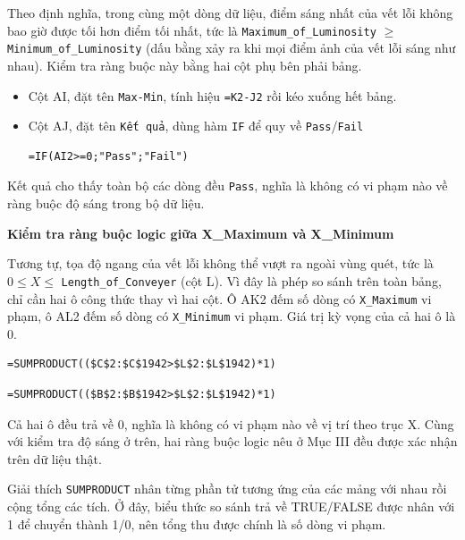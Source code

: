 \documentclass[12pt]{article}
\begin{document}
\noindent
Theo định nghĩa, trong cùng một dòng dữ liệu, điểm sáng nhất của vết lỗi không bao giờ được tối hơn điểm tối nhất, tức là \texttt{Maximum\_of\_Luminosity} $\ge$ \texttt{Minimum\_of\_Luminosity} (dấu bằng xảy ra khi mọi điểm ảnh của vết lỗi sáng như nhau). Kiểm tra ràng buộc này bằng hai cột phụ bên phải bảng.
\begin{itemize}
    \item Cột AI, đặt tên \texttt{Max-Min}, tính hiệu \texttt{=K2-J2} rồi kéo xuống hết bảng.
    \item Cột AJ, đặt tên \texttt{Kết quả}, dùng hàm \texttt{IF} để quy về \texttt{Pass}/\texttt{Fail}
    \begin{aivncodebox}
    \begin{lstlisting}[language=Excel]
=IF(AI2>=0;"Pass";"Fail")\end{lstlisting}
    \end{aivncodebox}
\end{itemize}
Kết quả cho thấy toàn bộ các dòng đều \texttt{Pass}, nghĩa là không có vi phạm nào về ràng buộc độ sáng trong bộ dữ liệu.

\noindent
\textbf{Kiểm tra ràng buộc logic giữa X\_Maximum và X\_Minimum}

\noindent
Tương tự, tọa độ ngang của vết lỗi không thể vượt ra ngoài vùng quét, tức là $0 \le X \le$ \texttt{Length\_of\_Conveyer} (cột L). Vì đây là phép so sánh trên toàn bảng, chỉ cần hai ô công thức thay vì hai cột. Ô AK2 đếm số dòng có \texttt{X\_Maximum} vi phạm, ô AL2 đếm số dòng có \texttt{X\_Minimum} vi phạm. Giá trị kỳ vọng của cả hai ô là 0.
\begin{aivncodebox}[ô AK2]
\begin{lstlisting}[language=Excel]
=SUMPRODUCT(($C$2:$C$1942>$L$2:$L$1942)*1)\end{lstlisting}
\end{aivncodebox}

\begin{aivncodebox}[ô AL2]
\begin{lstlisting}[language=Excel]
=SUMPRODUCT(($B$2:$B$1942>$L$2:$L$1942)*1)\end{lstlisting}
\end{aivncodebox}

\noindent
Cả hai ô đều trả về 0, nghĩa là không có vi phạm nào về vị trí theo trục X. Cùng với kiểm tra độ sáng ở trên, hai ràng buộc logic nêu ở Mục III đều được xác nhận trên dữ liệu thật.

\begin{guidelinebox}{Giải thích}
\texttt{SUMPRODUCT} nhân từng phần tử tương ứng của các mảng với nhau rồi cộng tổng các tích. Ở đây, biểu thức so sánh trả về TRUE/FALSE được nhân với 1 để chuyển thành 1/0, nên tổng thu được chính là số dòng vi phạm.
\end{guidelinebox}
\end{document}
